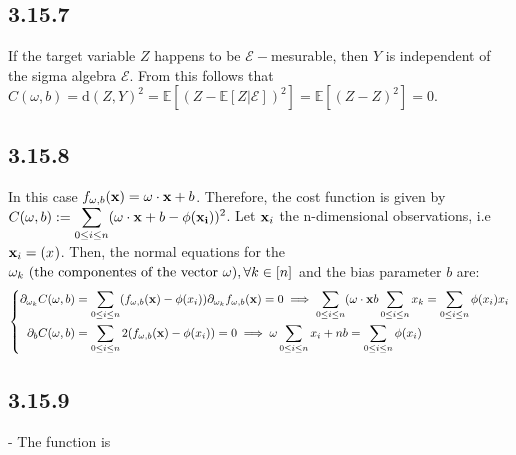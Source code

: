 \documentclass{exam}
\begin{document}
\subsection*{3.15.7}
If the target variable $Z$ happens to be $\mathcal{E}-$mesurable, then $Y$ is independent of the sigma algebra $\mathcal{E}$. From this follows that $C(\omega, b) = \text{d}(Z,Y)^2 = \mathbb{E} \left[ (Z - \mathbb{E}\left[ Z |\mathcal{E} \right] )^2\right]  = \mathbb{E} \left[ (Z - Z)^2\right] = 0$.

\subsection*{3.15.8}
In this case $f_{\tiny \bold{\omega}, b}(\bold{x}) = \bold{\omega} \cdot \bold{x} + b$. Therefore, the cost function is given by \\
$C(\bold{\omega}, b) := \displaystyle \sum_{\tiny 0 \leq i\leq n } ( \bold{\omega} \cdot \bold{x} + b - \phi(\bold{x_i}))^{2}$. Let $\bold{x}_i$ the n-dimensional observations, i.e $\bold{x}_i = (x_{}^{})$. Then, the normal equations for the $\omega_k \text{ (the componentes of the vector $\bold{\omega}$)}, \forall k \in \left[n\right]$ and 
the bias parameter $b$ are:\\
\begin{equation}
        \left\{
        \begin{aligned}
               \partial_{\omega_{k}}C(\bold{\omega}, b)&= \displaystyle \sum_{\tiny 0 \leq i\leq n } (f_{\tiny \bold{\omega}, b}(\bold{x}) -\phi(x_i))\displaystyle\partial_{\omega_k} f_{\tiny \bold{\omega}, b}(\bold{x})= 0  \implies \displaystyle\sum_{\tiny 0 \leq i\leq n } (\bold{\omega} \cdot \bold{x}  b \displaystyle\sum_{\tiny 0 \leq i\leq n } x_k = \displaystyle\sum_{\tiny 0 \leq i\leq n }\phi(x_i) x_i \\
               \partial_{b}C(\omega, b) &= \displaystyle \sum_{0 \leq i\leq n }  2(f_{\tiny \bold{\omega}, b}(\bold{x}) -\phi(x_i))  = 0 \implies \omega \displaystyle\sum_{\tiny 0 \leq i\leq n }x _i + nb = \displaystyle\sum_{\tiny 0 \leq i\leq n }\phi(x_i)
        \end{aligned}
        \right.
\end{equation}

\subsection*{3.15.9}-
The function is 
\end{document}
